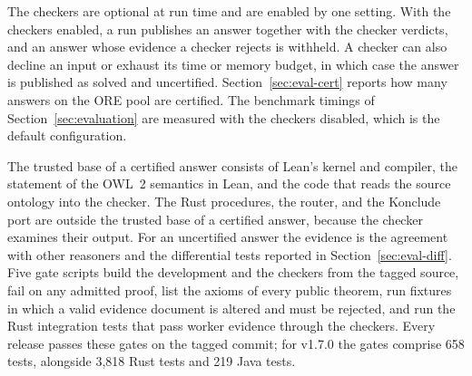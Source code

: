 The checkers are optional at run time and are enabled by one setting.  With
the checkers enabled, a run publishes an answer together with the checker
verdicts, and an answer whose evidence a checker rejects is withheld.  A
checker can also decline an input or exhaust its time or memory budget, in
which case the answer is published as solved and uncertified.
Section~\ref{sec:eval-cert} reports how many answers on the ORE pool are
certified.  The benchmark timings of Section~\ref{sec:evaluation} are measured
with the checkers disabled, which is the default configuration.

The trusted base of a certified answer consists of Lean's kernel and compiler,
the statement of the OWL~2 semantics in Lean, and the code that reads the
source ontology into the checker.  The Rust procedures, the router, and the
Konclude port are outside the trusted base of a certified answer, because the
checker examines their output.  For an uncertified answer the evidence is the
agreement with other reasoners and the differential tests reported in
Section~\ref{sec:eval-diff}.  Five gate scripts build the development and the
checkers from the tagged source, fail on any admitted proof, list the axioms of
every public theorem, run fixtures in which a valid evidence document is
altered and must be rejected, and run the Rust integration tests that pass
worker evidence through the checkers.  Every release passes these gates on the
tagged commit; for v1.7.0 the gates comprise 658 tests, alongside 3,818 Rust
tests and 219 Java tests.

